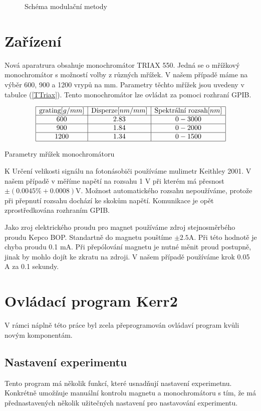 \begin{figure}
    \caption{Schéma modulační metody}
    \label{Schema modul}
\end{figure}

\section{Zařízení}
Nová aparatrura obsahuje monochromátor TRIAX 550. Jedná se o mřížkový monochromátor s možností volby z různých mřížek. V našem případě máme na výběr 600, 900 a 1200 vrypů na mm. Parametry těchto mřížek jsou uvedeny v tabulce (\ref{TTriax}). Tento monochromátor lze ovládat za pomoci rozhraní GPIB. 
\begin{table}
$$
\begin{array}{|c|c|c|}
\hline
\mbox{grating} [g/mm]&  \mbox{Disperze} [nm/mm]&    \mbox{Spektrální rozsah} [nm] \\ \hline
600&    2.83&   0 - 3000 \\ \hline
900&    1.84&   0 - 2000 \\ \hline
1200&   1.34&   0 - 1500 \\ \hline
\end{array}
$$
\caption{Parametry mřížek monochromátoru}
\label{TTriax}
\end{table}

K Určení velikosti signálu na fotonásobiči používáme mulimetr Keithley 2001. V našem případě v měříme napětí na rozsahu 1 V při kterém má přesnost $\pm(0.0045\%+0.0008)$V. Možnost automatického rozsahu nepoužíváme, protože při přepnutí rozsahu dochází ke skokům napětí. Komunikace je opět zprostředkována rozhraním GPIB.

Jako zroj elektrického proudu pro magnet používáme zdroj stejnosměrbého proudu Kepco BOP. Standartně do magnetu pouštíme $\pm 2.5$A. Při této hodnotě je chyba proudu 0.1 mA. Při přepólování magnetu je nutné měnit proud postupně, jinak by mohlo dojít ke zkratu na zdroji. V našem případě používáme krok 0.05 A za 0.1 sekundy.

\section{Ovládací program Kerr2}
V rámci náplně této práce byl zcela přeprogramován ovládaví program kvůli novým komponentám.

\subsection{Nastavení experimentu}
Tento program má několik funkcí, které usnadňují nastavení experimetnu. Konkrétně umožňuje manuální kontrolu magnetu a monochromátoru s tím, že má přednastavených několik užitečných nastavení pro nastavování experimentu.

